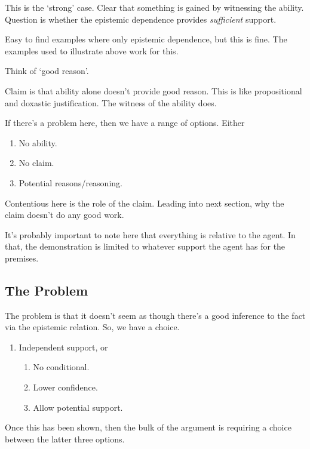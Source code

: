 \documentclass[10pt]{article}
\begin{document}
This is the `strong' case.
Clear that something is gained by witnessing the ability.
Question is whether the epistemic dependence provides \emph{sufficient} support.

Easy to find examples where only epistemic dependence, but this is fine.
The examples used to illustrate above work for this.

Think of `good reason'.

Claim is that ability alone doesn't provide good reason.
This is like propositional and doxastic justification.
The witness of the ability does.

If there's a problem here, then we have a range of options.
Either
\begin{enumerate}
\item No ability.
\item No claim.
\item Potential reasons/reasoning.
\end{enumerate}

Contentious here is the role of the claim.
{
  \color{red}
  Leading into next section, why the claim doesn't do any good work.
}

\begin{note}
  It's probably important to note here that everything is relative to the agent.
  In that, the demonstration is limited to whatever support the agent has for the premises.
\end{note}

\subsection{The Problem}
\label{sec:problem}

\begin{note}[Overview]
  The problem is that it doesn't seem as though there's a good inference to the fact via the epistemic relation.
  So, we have a choice.
  \begin{enumerate}
  \item Independent support, or
    \begin{enumerate}
    \item No conditional.
    \item Lower confidence.
    \item Allow potential support.
    \end{enumerate}
  \end{enumerate}
  Once this has been shown, then the bulk of the argument is requiring a choice between the latter three options.
\end{note}
\end{document}
